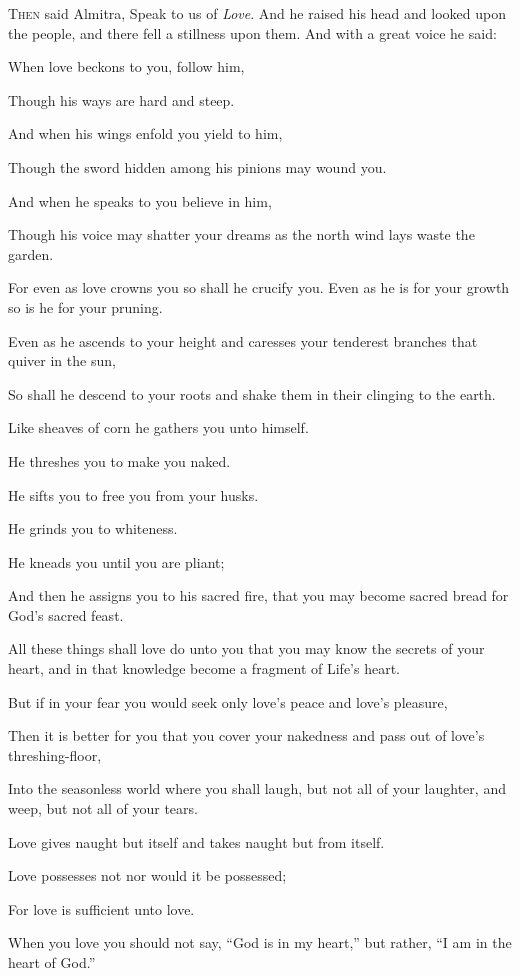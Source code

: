\lettrine{T}{hen} said Almitra, Speak to us of
\textit{Love}. And he raised his head and looked upon
the people, and there fell a stillness
upon them. And with a great voice he
said:

When love beckons to you, follow him,

Though his ways are hard and steep.

And when his wings enfold you yield to
him,

Though the sword hidden among his
pinions may wound you.

And when he speaks to you believe in
him,

Though his voice may shatter your dreams
as the north wind lays waste the garden.

For even as love crowns you so shall
he crucify you. Even as he is for your
growth so is he for your pruning.

Even as he ascends to your height and
caresses your tenderest branches
that quiver in the sun,

So shall he descend to your roots and
shake them in their clinging to the
earth.

Like sheaves of corn he gathers you unto
himself.

He threshes you to make you naked.

He sifts you to free you from your
husks.

He grinds you to whiteness.

He kneads you until you are pliant;

And then he assigns you to his sacred
fire, that you may become sacred bread
for God’s sacred feast.

All these things shall love do unto you
that you may know the secrets of your
heart, and in that knowledge become a
fragment of Life’s heart.

But if in your fear you would seek only
love’s peace and love’s pleasure,

Then it is better for you that you
cover your nakedness and pass out of
love’s threshing-floor,

Into the seasonless world where you
shall laugh, but not all of your
laughter, and weep, but not all of your
tears.

Love gives naught but itself and takes
naught but from itself.

Love possesses not nor would it be
possessed;

For love is sufficient unto love.

When you love you should not say, \enquote{God
is in my heart,} but rather, \enquote{I am in
the heart of God.}

